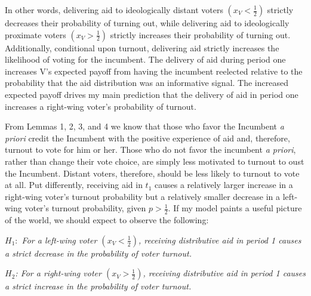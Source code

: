 \documentclass[12pt]{paper}
\begin{document}
In other words, delivering aid to ideologically distant voters $(x_V < \frac{1}{2})$ strictly decreases their probability of turning out, while delivering aid to ideologically proximate voters $(x_V > \frac{1}{2})$  strictly increases their probability of turning out. Additionally, conditional upon turnout, delivering aid strictly increases the likelihood of voting for the incumbent. The delivery of aid during period one increases V’s expected payoff from having the incumbent reelected relative to the probability that the aid distribution was an informative signal. The increased expected payoff drives my main prediction that the delivery of aid in period one increases a right-wing voter's probability of turnout.

From Lemmas 1, 2, 3, and 4 we know that those who favor the Incumbent \emph{a priori} credit the Incumbent with the positive experience of aid and, therefore, turnout to vote for him or her. Those who do not favor the incumbent \emph{a priori}, rather than change their vote choice, are simply less motivated to turnout to oust the Incumbent. Distant voters, therefore, should be less likely to turnout to vote at all. Put differently, receiving aid in $t_1$ causes a relatively larger increase in a right-wing voter’s turnout probability but a relatively smaller decrease in a left-wing voter’s turnout probability, given $p > \frac{1}{2}$. If my model paints a useful picture of the world, we should expect to observe the following:

\emph{$H_1:$ For a left-wing voter $(x_V < \frac{1}{2})$, receiving distributive aid in period 1 causes a strict decrease in the probability of voter turnout.}

\emph{$H_2$: For a right-wing voter $(x_V > \frac{1}{2})$, receiving distributive aid in period 1 causes a strict increase in the probability of voter turnout.}
\end{document}
